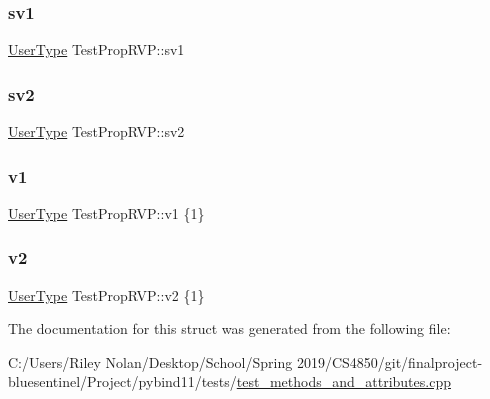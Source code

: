 \subsubsection{\texorpdfstring{sv1}{sv1}}
{\footnotesize\ttfamily \mbox{\hyperlink{class_user_type}{User\+Type}} Test\+Prop\+R\+V\+P\+::sv1\hspace{0.3cm}{\ttfamily [static]}}

\mbox{\label{struct_test_prop_r_v_p_a945b6ef24e72a96f63e0595e5c7196da}} 
\subsubsection{\texorpdfstring{sv2}{sv2}}
{\footnotesize\ttfamily \mbox{\hyperlink{class_user_type}{User\+Type}} Test\+Prop\+R\+V\+P\+::sv2\hspace{0.3cm}{\ttfamily [static]}}

\mbox{\label{struct_test_prop_r_v_p_ad35c589f3c9a873ef2653778ee5c872e}} 
\subsubsection{\texorpdfstring{v1}{v1}}
{\footnotesize\ttfamily \mbox{\hyperlink{class_user_type}{User\+Type}} Test\+Prop\+R\+V\+P\+::v1 \{1\}}

\mbox{\label{struct_test_prop_r_v_p_aa8d27467eb5aae4113118ca085078e55}} 
\subsubsection{\texorpdfstring{v2}{v2}}
{\footnotesize\ttfamily \mbox{\hyperlink{class_user_type}{User\+Type}} Test\+Prop\+R\+V\+P\+::v2 \{1\}}



The documentation for this struct was generated from the following file\+:\begin{DoxyCompactItemize}
\item 
C\+:/\+Users/\+Riley Nolan/\+Desktop/\+School/\+Spring 2019/\+C\+S4850/git/finalproject-\/bluesentinel/\+Project/pybind11/tests/\mbox{\hyperlink{test__methods__and__attributes_8cpp}{test\+\_\+methods\+\_\+and\+\_\+attributes.\+cpp}}\end{DoxyCompactItemize}
